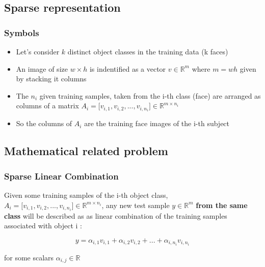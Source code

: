 \documentclass{beamer}
\begin{document}

	\subsection{Sparse representation}
		
	
		\begin{frame}
		\frametitle{Symbols}
		
			\begin{itemize}
				\item Let's consider $k$ distinct object classes in the training data (k faces)
				\item An image of size $w \times h$  is indentified as a vector $v \in \mathbb{R}^{m}$ where $m=wh$ given by stacking it columns
				\item The $n_{i}$ given training samples, taken from the i-th class (face) are arranged as columns of a matrix $A_{i}=\lbrack v_{i,1},v_{i,2},...,v_{i,n_{i}} \rbrack \in \mathbb{R}^{m \times n_{i}} $
				\item So the columns of $A_{i}$ are the training face images of the i-th subject
				
			\end{itemize}

		\end{frame}


	
	\subsection{Mathematical related problem}
	
	
		\begin{frame}
		\frametitle{Sparse Linear Combination}

Given some training samples of the i-th object class, $A_{i}=\lbrack v_{i,1},v_{i,2},...,v_{i,n_{i}} \rbrack \in \mathbb{R}^{m \times n_{i}} $, any new test sample $y \in \mathbb{R}^{m}$ \textbf{from the same class} will be described as as linear combination of the training samples associated with object i :

$$y=\alpha_{i,1}v_{i,1}+\alpha_{i,2}v_{i,2}+...+\alpha_{i,n_{i}}v_{i,n_{i}}$$

for some scalars $\alpha_{i,j} \in \mathbb{R}$

		\end{frame}
\end{document}
